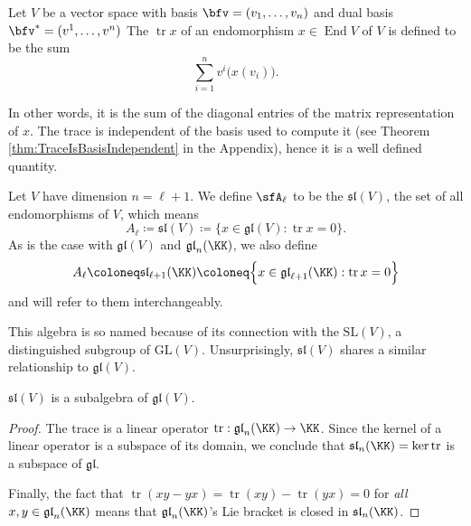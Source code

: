 \documentclass{article}
\DeclareMathOperator{\End}{End}
\DeclareMathOperator{\tr}{tr}
\newcommand{\GL}{\ensuremath{\text{GL}}}
\newcommand{\SL}{\ensuremath{\text{SL}}}
\newcommand{\glalg}{\ensuremath{\mathfrak{gl}}}
\newcommand{\slalg}{\ensuremath{\mathfrak{sl}}}
\begin{document}
\begin{definition}
    Let $V$ be a vector space with basis $\bfv = (v_1, \ldots, v_n)$ and dual basis $\bfv^\ast = (v^1, \ldots, v^n)$
    The  $\tr x$ of an endomorphism $x \in \End V$ of $V$ is defined to be the sum
    \[
        \sum_{i=1}^n 
        v^i\Big(x(v_i)\Big).
    \]
\end{definition}

In other words, it is the sum of the diagonal entries of the matrix representation of $x$.
The trace is independent of the basis used to compute it (see Theorem \ref{thm:TraceIsBasisIndependent} in the Appendix), hence it is a well defined quantity.

\begin{definition}
    Let $V$ have dimension $n = \ell + 1$.
    We define $\sfA_\ell$ to be the  $\slalg(V)$, the set of all  endomorphisms of $V$, which means
    \[
        A_\ell
        \coloneq
        \slalg(V)
        \coloneq
        \Big\{
            x \in \glalg(V) : \tr x = 0
        \Big\}.
    \]
    As is the case with $\glalg(V)$ and $\glalg_n(\KK)$, we also define 
    \[
        A_\ell
        \coloneq
        \slalg_{\ell+1}(\KK)
        \coloneq
        \Big\{
            x \in \glalg_{\ell+1}(\KK) : \tr x = 0
        \Big\}
    \]
    and will refer to them interchangeably.
\end{definition}

This algebra is so named because of its connection with the  $\SL(V)$, a distinguished subgroup of $\GL(V)$.
Unsurprisingly, $\slalg(V)$ shares a similar relationship to $\glalg(V)$.

\begin{proposition}
    $\slalg(V)$ is a subalgebra of $\glalg(V)$.
\end{proposition}
\begin{proof}
    The trace is a linear operator $\tr: \glalg_n(\KK) \to \KK$.
    Since the kernel of a linear operator is a subspace of its domain, we conclude that $\slalg_n(\KK) = \ker \tr$ is a subspace of $\glalg$.

    Finally, the fact that $\tr(xy - yx) = \tr(xy) - \tr(yx) = 0$ for \textit{all} $x,y \in \glalg_n(\KK)$ means that $\glalg_n(\KK)$'s Lie bracket is closed in $\slalg_n(\KK)$.
\end{proof}
\end{document}
